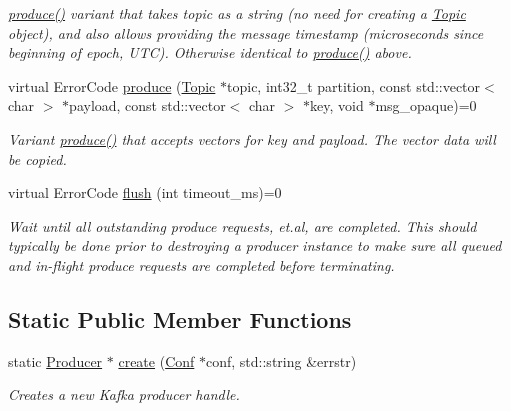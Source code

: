\begin{DoxyCompactItemize}
\begin{DoxyCompactList}\small\item\em \hyperlink{classRdKafka_1_1Producer_ab90a30c5e5fb006a3b4004dc4c9a7923}{produce()} variant that takes topic as a string (no need for creating a \hyperlink{classRdKafka_1_1Topic}{Topic} object), and also allows providing the message timestamp (microseconds since beginning of epoch, UTC). Otherwise identical to \hyperlink{classRdKafka_1_1Producer_ab90a30c5e5fb006a3b4004dc4c9a7923}{produce()} above. \item\end{DoxyCompactList}\item 
\hypertarget{classRdKafka_1_1Producer_ac51872fe6252093fc0c271557d132d28}{
virtual ErrorCode \hyperlink{classRdKafka_1_1Producer_ac51872fe6252093fc0c271557d132d28}{produce} (\hyperlink{classRdKafka_1_1Topic}{Topic} $\ast$topic, int32\_\-t partition, const std::vector$<$ char $>$ $\ast$payload, const std::vector$<$ char $>$ $\ast$key, void $\ast$msg\_\-opaque)=0}
\label{classRdKafka_1_1Producer_ac51872fe6252093fc0c271557d132d28}

\begin{DoxyCompactList}\small\item\em Variant \hyperlink{classRdKafka_1_1Producer_ab90a30c5e5fb006a3b4004dc4c9a7923}{produce()} that accepts vectors for key and payload. The vector data will be copied. \item\end{DoxyCompactList}\item 
virtual ErrorCode \hyperlink{classRdKafka_1_1Producer_afa33f8d26eb49f8cc7988397bbb2db42}{flush} (int timeout\_\-ms)=0
\begin{DoxyCompactList}\small\item\em Wait until all outstanding produce requests, et.al, are completed. This should typically be done prior to destroying a producer instance to make sure all queued and in-\/flight produce requests are completed before terminating. \item\end{DoxyCompactList}\end{DoxyCompactItemize}
\subsection*{Static Public Member Functions}
\begin{DoxyCompactItemize}
\item 
static \hyperlink{classRdKafka_1_1Producer}{Producer} $\ast$ \hyperlink{classRdKafka_1_1Producer_a540569ee0152703cdad4b45419f64b39}{create} (\hyperlink{classRdKafka_1_1Conf}{Conf} $\ast$conf, std::string \&errstr)
\begin{DoxyCompactList}\small\item\em Creates a new Kafka producer handle. \item\end{DoxyCompactList}\end{DoxyCompactItemize}


